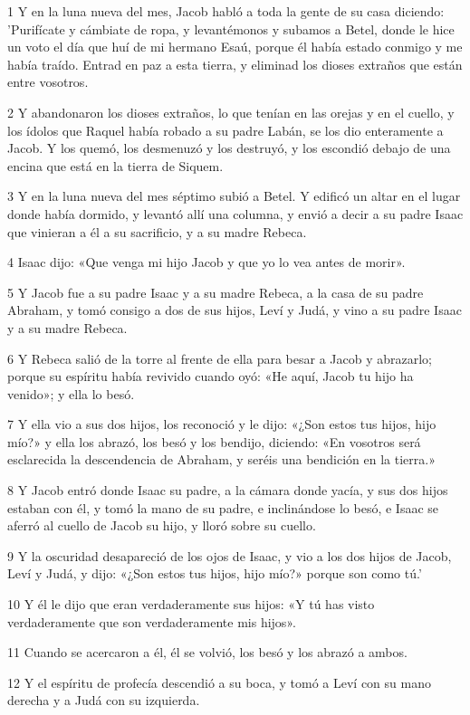 \par 1 Y en la luna nueva del mes, Jacob habló a toda la gente de su casa diciendo: 'Purifícate y cámbiate de ropa, y levantémonos y subamos a Betel, donde le hice un voto el día que huí de mi hermano Esaú, porque él había estado conmigo y me había traído. Entrad en paz a esta tierra, y eliminad los dioses extraños que están entre vosotros.
\par 2 Y abandonaron los dioses extraños, lo que tenían en las orejas y en el cuello, y los ídolos que Raquel había robado a su padre Labán, se los dio enteramente a Jacob. Y los quemó, los desmenuzó y los destruyó, y los escondió debajo de una encina que está en la tierra de Siquem.
\par 3 Y en la luna nueva del mes séptimo subió a Betel. Y edificó un altar en el lugar donde había dormido, y levantó allí una columna, y envió a decir a su padre Isaac que vinieran a él a su sacrificio, y a su madre Rebeca.
\par 4 Isaac dijo: «Que venga mi hijo Jacob y que yo lo vea antes de morir».
\par 5 Y Jacob fue a su padre Isaac y a su madre Rebeca, a la casa de su padre Abraham, y tomó consigo a dos de sus hijos, Leví y Judá, y vino a su padre Isaac y a su madre Rebeca.
\par 6 Y Rebeca salió de la torre al frente de ella para besar a Jacob y abrazarlo; porque su espíritu había revivido cuando oyó: «He aquí, Jacob tu hijo ha venido»; y ella lo besó.
\par 7 Y ella vio a sus dos hijos, los reconoció y le dijo: «¿Son estos tus hijos, hijo mío?» y ella los abrazó, los besó y los bendijo, diciendo: «En vosotros será esclarecida la descendencia de Abraham, y seréis una bendición en la tierra.»
\par 8 Y Jacob entró donde Isaac su padre, a la cámara donde yacía, y sus dos hijos estaban con él, y tomó la mano de su padre, e inclinándose lo besó, e Isaac se aferró al cuello de Jacob su hijo, y lloró sobre su cuello.
\par 9 Y la oscuridad desapareció de los ojos de Isaac, y vio a los dos hijos de Jacob, Leví y Judá, y dijo: «¿Son estos tus hijos, hijo mío?» porque son como tú.'
\par 10 Y él le dijo que eran verdaderamente sus hijos: «Y tú has visto verdaderamente que son verdaderamente mis hijos».
\par 11 Cuando se acercaron a él, él se volvió, los besó y los abrazó a ambos.
\par 12 Y el espíritu de profecía descendió a su boca, y tomó a Leví con su mano derecha y a Judá con su izquierda.
